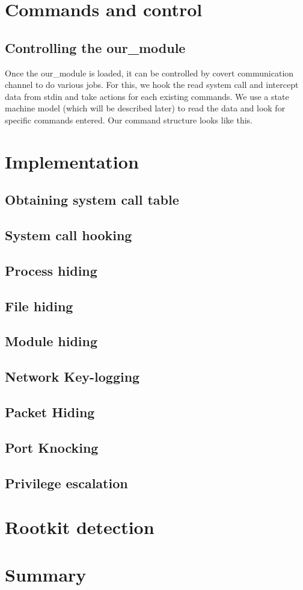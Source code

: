 \documentclass[10pt, letterpaper]{scrartcl}
\begin{document}
\section{Commands and control}
    \subsection{Controlling the our\_module}
    Once the our\_module is loaded, it can be controlled by covert communication channel to do various jobs. For this, we hook the read system call and intercept data from stdin and take actions for each existing  commands. We use a state machine model (which will be described later) to read the data and look for specific commands entered. Our command structure looks like this.

\section{Implementation}

\subsection{Obtaining system call table}
\subsection{System call hooking}
\subsection{Process hiding}
\subsection{File hiding}
\subsection{Module hiding}
\subsection{Network Key-logging}
\subsection{Packet Hiding}
\subsection{Port Knocking}
\subsection{Privilege escalation}

\section{Rootkit detection}

\section{Summary}
\end{document}
